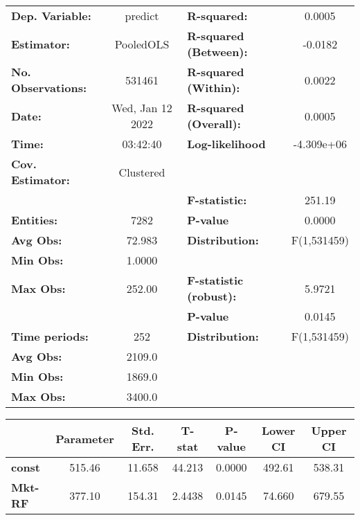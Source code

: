 \begin{center}
\begin{tabular}{lclc}
\toprule
\textbf{Dep. Variable:}    &      predict       & \textbf{  R-squared:         }   &      0.0005      \\
\textbf{Estimator:}        &     PooledOLS      & \textbf{  R-squared (Between):}  &     -0.0182      \\
\textbf{No. Observations:} &       531461       & \textbf{  R-squared (Within):}   &      0.0022      \\
\textbf{Date:}             &  Wed, Jan 12 2022  & \textbf{  R-squared (Overall):}  &      0.0005      \\
\textbf{Time:}             &      03:42:40      & \textbf{  Log-likelihood     }   &    -4.309e+06    \\
\textbf{Cov. Estimator:}   &     Clustered      & \textbf{                     }   &                  \\
\textbf{}                  &                    & \textbf{  F-statistic:       }   &      251.19      \\
\textbf{Entities:}         &        7282        & \textbf{  P-value            }   &      0.0000      \\
\textbf{Avg Obs:}          &       72.983       & \textbf{  Distribution:      }   &   F(1,531459)    \\
\textbf{Min Obs:}          &       1.0000       & \textbf{                     }   &                  \\
\textbf{Max Obs:}          &       252.00       & \textbf{  F-statistic (robust):} &      5.9721      \\
\textbf{}                  &                    & \textbf{  P-value            }   &      0.0145      \\
\textbf{Time periods:}     &        252         & \textbf{  Distribution:      }   &   F(1,531459)    \\
\textbf{Avg Obs:}          &       2109.0       & \textbf{                     }   &                  \\
\textbf{Min Obs:}          &       1869.0       & \textbf{                     }   &                  \\
\textbf{Max Obs:}          &       3400.0       & \textbf{                     }   &                  \\
\bottomrule
\end{tabular}
\begin{tabular}{lcccccc}
                & \textbf{Parameter} & \textbf{Std. Err.} & \textbf{T-stat} & \textbf{P-value} & \textbf{Lower CI} & \textbf{Upper CI}  \\
\midrule
\textbf{const}  &       515.46       &       11.658       &      44.213     &      0.0000      &       492.61      &       538.31       \\
\textbf{Mkt-RF} &       377.10       &       154.31       &      2.4438     &      0.0145      &       74.660      &       679.55       \\
\bottomrule
\end{tabular}
\end{center}
